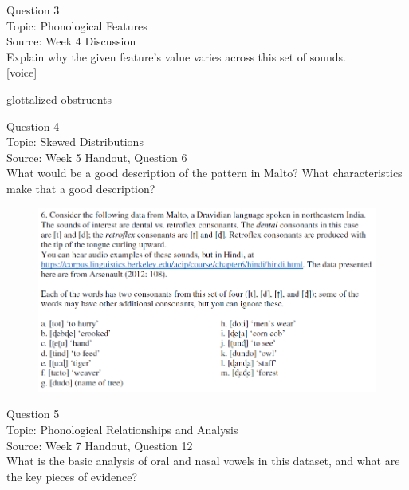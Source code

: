 \documentclass[12pt]{article}
\begin{document}
\newpage

{\large Question 3}\\

Topic: Phonological Features\\
Source: Week 4 Discussion\\

Explain why the given feature's value varies across this set of sounds.\\

{[voice]}

glottalized obstruents


\newpage

{\large Question 4}\\

Topic: Skewed Distributions\\
Source: Week 5 Handout, Question 6\\

What would be a good description of the pattern in Malto? What characteristics make that a good description?\\

\begin{figure}[H]
\includegraphics{../images/malto.png}
\end{figure}

\newpage

{\large Question 5}\\

Topic: Phonological Relationships and Analysis\\
Source: Week 7 Handout, Question 12\\

What is the basic analysis of oral and nasal vowels in this dataset, and what are the key pieces of evidence?\\
\end{document}
